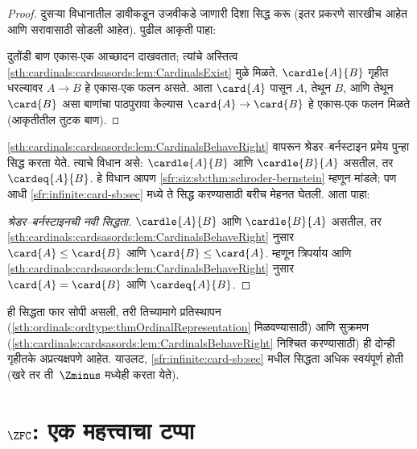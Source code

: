 \begin{proof}
दुसऱ्या विधानातील डावीकडून उजवीकडे जाणारी दिशा सिद्ध करू (इतर प्रकरणे सारखीच आहेत आणि सरावासाठी सोडली आहेत). पुढील आकृती पाहा:
\begin{center}
\end{center}
दुतोंडी बाण एकास-एक आच्छादन दाखवतात; त्यांचे अस्तित्व \ref{sth:cardinals:cardsasords:lem:CardinalsExist} मुळे मिळते. $\cardle{A}{B}$ गृहीत धरल्यावर $A\to B$ हे एकास-एक फलन असते. आता $\card{A}$ पासून $A$, तेथून $B$, आणि तेथून $\card{B}$ असा बाणांचा पाठपुरावा केल्यास $\card{A} \to \card{B}$ हे एकास-एक फलन मिळते (आकृतीतील तुटक बाण).
\end{proof}\noindent \ref{sth:cardinals:cardsasords:lem:CardinalsBehaveRight} वापरून श्रेडर--बर्नस्टाइन प्रमेय पुन्हा सिद्ध करता येते. त्याचे विधान असे: $\cardle{A}{B}$ आणि $\cardle{B}{A}$ असतील, तर $\cardeq{A}{B}$. हे विधान आपण \ref{sfr:siz:sb:thm:schroder-bernstein} म्हणून मांडले; पण आधी \ref{sfr:infinite:card-sb:sec} मध्ये ते सिद्ध करण्यासाठी बरीच मेहनत घेतली. आता पाहा:

\begin{proof}[श्रेडर--बर्नस्टाइनची नवी सिद्धता]
$\cardle{A}{B}$ आणि $\cardle{B}{A}$ असतील, तर \ref{sth:cardinals:cardsasords:lem:CardinalsBehaveRight} नुसार $\card{A} \leq \card{B}$ आणि $\card{B} \leq \card{A}$. म्हणून त्रिपर्याय आणि \ref{sth:cardinals:cardsasords:lem:CardinalsBehaveRight} नुसार $\card{A} = \card{B}$ आणि $\cardeq{A}{B}$.
\end{proof}
\noindent
ही सिद्धता फार सोपी असली, तरी तिच्यामागे प्रतिस्थापन (\ref{sth:ordinals:ordtype:thmOrdinalRepresentation} मिळवण्यासाठी) आणि सुक्रमण (\ref{sth:cardinals:cardsasords:lem:CardinalsBehaveRight} निश्चित करण्यासाठी) ही दोन्ही गृहीतके अप्रत्यक्षपणे आहेत. याउलट, \ref{sfr:infinite:card-sb:sec} मधील सिद्धता अधिक स्वयंपूर्ण होती (खरे तर ती~$\Zminus$ मध्येही करता येते).







\section{$\ZFC$: एक महत्त्वाचा टप्पा}\label{sth:cardinals:zfc:sec}

